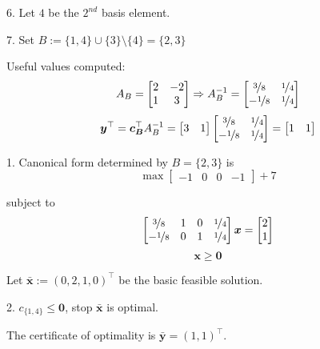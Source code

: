 6. Let $ 4 $ be the $ 2^{nd} $ basis element.

7. Set $ B:=\{1,4\}\cup \{3\}\setminus\{4\}=\{2,3\} $


Useful values computed:
\[ A_B=
\begin{bmatrix}
    2 & -2\\
    1 & 3\\
\end{bmatrix} \Rightarrow
A_B^{-1}=
\begin{bmatrix}
    \nicefrac{3}{8} & \nicefrac{1}{4} \\
    -\nicefrac{1}{8} & \nicefrac{1}{4} 
\end{bmatrix} \]
\[ \bm{y}^\top=\bm{c_B}^\top A_B^{-1}=
\begin{bmatrix}
    3 & 1
\end{bmatrix}
\begin{bmatrix}
    \nicefrac{3}{8} & \nicefrac{1}{4} \\
    -\nicefrac{1}{8} & \nicefrac{1}{4} 
\end{bmatrix}=
\begin{bmatrix}
    1 & 1
\end{bmatrix}\]

1. Canonical form determined by $ B=\{2,3\} $ is
\[ \max
\begin{bmatrix}
    -1 & 0 & 0 & -1
\end{bmatrix} + 7\]

subject to
\[ 
\begin{bmatrix}
    \nicefrac{3}{8} & 1 & 0 & \nicefrac{1}{4} \\
    -\nicefrac{1}{8} & 0 & 1 & \nicefrac{1}{4}
\end{bmatrix}\bm{x}=
\begin{bmatrix}
    2\\
    1
\end{bmatrix}\]
\[ \bm{x}\ge \bm{0} \]

Let $ \bm{\bar{x}}:=(0,2,1,0)^\top $ be the basic feasible solution.

2. $ c_{\{1,4\}}\le \bm{0} $, stop $ \bm{\bar{x}} $ is optimal.

The certificate of optimality is $ \bm{\bar{y}}=(1,1)^\top $.

